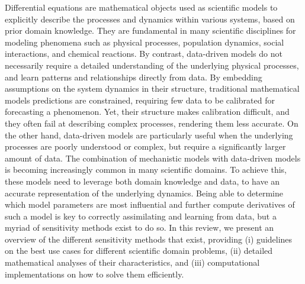 Differential equations are mathematical objects used as scientific models to explicitly describe the processes and dynamics within various systems, based on prior domain knowledge. 
They are fundamental in many scientific disciplines for modeling phenomena such as physical processes, population dynamics, social interactions, and chemical reactions.
By contrast, data-driven models do not necessarily require a detailed understanding of the underlying physical processes, and learn patterns and relationships directly from data. 
By embedding assumptions on the system dynamics in their structure, traditional mathematical models predictions are constrained, requiring few data to be calibrated for forecasting a phenomenon. Yet, their structure makes calibration difficult, and they often fail at describing complex processes, rendering them less accurate.
On the other hand, data-driven models are particularly useful when the underlying processes are poorly understood or complex, but require a significantly larger amount of data.
The combination of mechanistic models with data-driven models is becoming increasingly common in many scientific domains. 
To achieve this, these models need to leverage both domain knowledge and data, to have an accurate representation of the underlying dynamics. 
Being able to determine which model parameters are most influential and further compute derivatives of such a model is key to correctly assimilating and learning from data, but a myriad of sensitivity methods exist to do so. 
In this review, we present an overview of the different sensitivity methods that exist, providing (i) guidelines on the best use cases for different scientific domain problems, (ii) detailed mathematical analyses of their characteristics, and (iii) computational implementations on how to solve them efficiently. 
